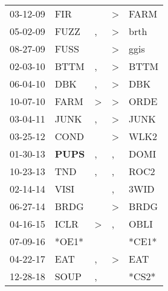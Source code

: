 \begin{supertabular}{p{0.07\textwidth}p{0.06\textwidth}p{0.02\textwidth}p{0.02\textwidth}p{0.06\textwidth}}
 03-12-09\textsuperscript{} &            FIR\textsuperscript{} &               &  \textgreater &  FARM\textsuperscript{} \\
 05-02-09\textsuperscript{} &           FUZZ\textsuperscript{} &             , &  \textgreater &  brth\textsuperscript{} \\
 08-27-09\textsuperscript{} &           FUSS\textsuperscript{} &               &  \textgreater &  ggis\textsuperscript{} \\
 02-03-10\textsuperscript{} &           BTTM\textsuperscript{} &             , &  \textgreater &  BTTM\textsuperscript{} \\
 06-04-10\textsuperscript{} &            DBK\textsuperscript{} &             , &  \textgreater &   DBK\textsuperscript{} \\
 10-07-10\textsuperscript{} &           FARM\textsuperscript{} &  \textgreater &  \textgreater &  ORDE\textsuperscript{} \\
 03-04-11\textsuperscript{} &           JUNK\textsuperscript{} &             , &  \textgreater &  JUNK\textsuperscript{} \\
 03-25-12\textsuperscript{} &           COND\textsuperscript{} &               &  \textgreater &  WLK2\textsuperscript{} \\
 01-30-13\textsuperscript{} &  \textbf{PUPS\textsuperscript{}} &             , &             , &  DOMI\textsuperscript{} \\
 10-23-13\textsuperscript{} &            TND\textsuperscript{} &             , &             , &  ROC2\textsuperscript{} \\
 02-14-14\textsuperscript{} &           VISI\textsuperscript{} &               &             , &  3WID\textsuperscript{} \\
 06-27-14\textsuperscript{} &           BRDG\textsuperscript{} &               &  \textgreater &  BRDG\textsuperscript{} \\
 04-16-15\textsuperscript{} &           ICLR\textsuperscript{} &  \textgreater &             , &  OBLI\textsuperscript{} \\
 07-09-16\textsuperscript{} &                            *OE1* &               &               &                   *CE1* \\
 04-22-17\textsuperscript{} &            EAT\textsuperscript{} &             , &  \textgreater &   EAT\textsuperscript{} \\
 12-28-18\textsuperscript{} &           SOUP\textsuperscript{} &             , &               &                   *CS2* \\
\end{supertabular}
